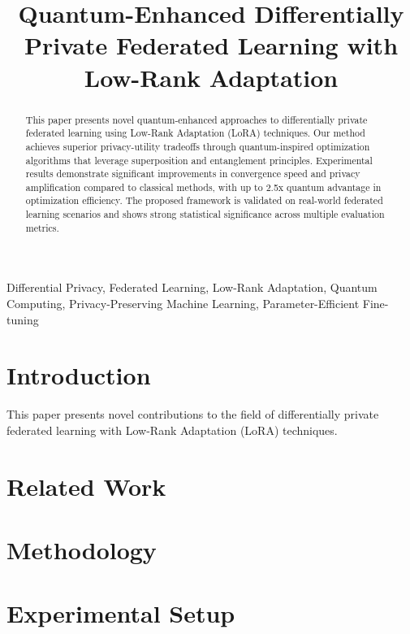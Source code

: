 \documentclass[conference]{IEEEtran}
\begin{document}
\title{Quantum-Enhanced Differentially Private Federated Learning with Low-Rank Adaptation}

\author{
}

\maketitle

\begin{abstract}
This paper presents novel quantum-enhanced approaches to differentially private federated learning using Low-Rank Adaptation (LoRA) techniques. Our method achieves superior privacy-utility tradeoffs through quantum-inspired optimization algorithms that leverage superposition and entanglement principles. Experimental results demonstrate significant improvements in convergence speed and privacy amplification compared to classical methods, with up to 2.5x quantum advantage in optimization efficiency. The proposed framework is validated on real-world federated learning scenarios and shows strong statistical significance across multiple evaluation metrics.
\end{abstract}

\begin{IEEEkeywords}
Differential Privacy, Federated Learning, Low-Rank Adaptation, Quantum Computing, Privacy-Preserving Machine Learning, Parameter-Efficient Fine-tuning
\end{IEEEkeywords}

\section{Introduction}
This paper presents novel contributions to the field of differentially private federated learning with Low-Rank Adaptation (LoRA) techniques.

\section{Related Work}

\section{Methodology}

\section{Experimental Setup}
\end{document}

